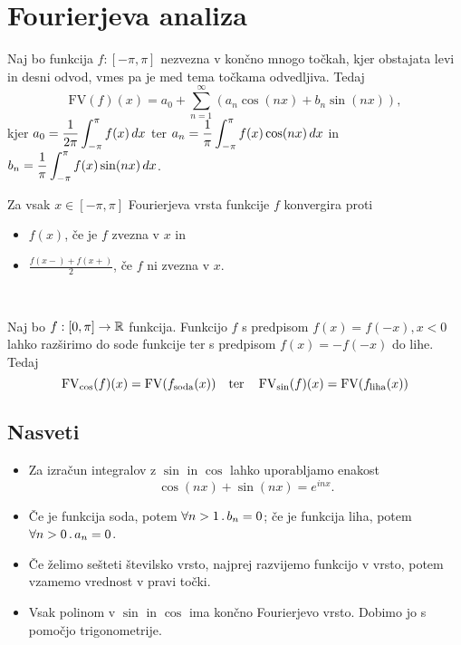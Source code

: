 \section{Fourierjeva analiza}

Naj bo funkcija \(f: [-\pi, \pi]\) nezvezna v končno mnogo točkah, kjer obstajata levi in desni odvod, vmes pa je med tema točkama odvedljiva. Tedaj 
\[
    \text{FV}(f)(x) = a_0 + \sum_{n=1}^{\infty}(a_n \cos(nx) + b_n \sin(nx)),
\]
kjer \(\displaystyle a_0 = \frac{1}{2\pi} \int_{-\pi}^{\pi} f(x) \, dx\) ter \(\displaystyle a_n = \frac{1}{\pi} \int_{-\pi}^{\pi} f(x)  \cos(nx) \, dx\) in \(\displaystyle b_n = \frac{1}{\pi} \int_{-\pi}^{\pi} f(x)  \sin(nx) \, dx\).

Za vsak \(x \in [-\pi, \pi]\) Fourierjeva vrsta funkcije \(f\) konvergira proti 
\begin{itemize}
    \item \(f(x)\), če je \(f\) zvezna v \(x\) in 
    \item \(\frac{f(x-) + f(x+)}{2}\), če \(f\) ni zvezna v \(x\).
\end{itemize}

\ 

Naj bo \(f: [0, \pi] \to \mathbb{R}\) funkcija. Funkcijo \(f\) s predpisom \(f(x) = f(-x), x < 0\) lahko razširimo do sode funkcije ter s predpisom \(f(x) = -f(-x)\) do lihe. Tedaj 
\[
    \operatorname{FV}_{\cos}(f)(x) = \operatorname{FV}(f_{\text{soda}}(x)) \quad \text{ter} \quad \operatorname{FV}_{\sin}(f)(x) = \text{FV}(f_{\text{liha}}(x))
\]

\subsection{Nasveti}
\begin{itemize}
    \item Za izračun integralov z \(\sin\) in \(\cos\) lahko uporabljamo enakost 
    \[
        \cos(nx) + \sin(nx) = e^{inx}.
    \]
    \item Če je funkcija soda, potem \(\forall n > 1 \,.\, b_n = 0\); če je funkcija liha, potem \(\forall n > 0 \,.\, a_n = 0\).
    \item Če želimo sešteti številsko vrsto, najprej razvijemo funkcijo v vrsto, potem vzamemo vrednost v pravi točki.
    \item Vsak polinom v \(\sin\) in \(\cos\) ima končno Fourierjevo vrsto. Dobimo jo s pomočjo trigonometrije.
\end{itemize}